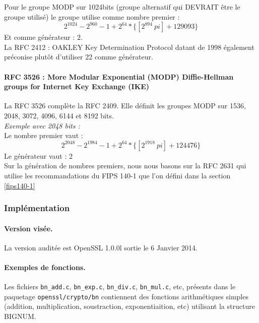 			Pour le groupe MODP sur 1024bits (groupe alternatif qui DEVRAIT être le groupe utilisé) le groupe utilise comme nombre premier :
			$$ 2^{1024} - 2^{960} - 1 + 2^{64} * \{[2^{894}\ pi] + 129093\}$$
			Et comme générateur : 2. \\

			La RFC 2412 : OAKLEY Key Determination Protocol datant de 1998 également \cite{rfc2412} préconise plutôt d'utiliser 22 comme générateur.

			\paragraph{RFC 3526 : More Modular Exponential (MODP) Diffie-Hellman groups for Internet Key Exchange (IKE)\\}

			La RFC 3526 \cite{rfc3526} complète la RFC 2409. Elle définit les groupes MODP sur 1536, 2048, 3072, 4096, 6144 et 8192 bits.\\

			\textit{Exemple avec 2048 bits :}\\
			Le nombre premier vaut :
			$$ 2^{2048} - 2^{1984} - 1 + 2^{64} * \{ [2^{1918}\ pi] + 124476 \} $$
			Le générateur vaut : 2\\

			Sur la génération de nombres premiers, nous nous basons sur la RFC 2631 qui utilise les recommandations du FIPS 140-1 que l'on défini dans la section \ref{fips140-1}


		\subsubsection{Implémentation}
			\paragraph{Version visée. \\}

			La version auditée est OpenSSL 1.0.0l sortie le 6 Janvier 2014.

			\paragraph{Exemples de fonctions. \\}

			Les fichiers \texttt{bn\_add.c}, \texttt{bn\_exp.c}, \texttt{bn\_div.c}, \texttt{bn\_mul.c}, etc, présents dans le paquetage \texttt{openssl/crypto/bn} contiennent des fonctions arithmétiques simples (addition, multiplication, soustraction, exponentiaition, etc) utilisant la structure BIGNUM.

